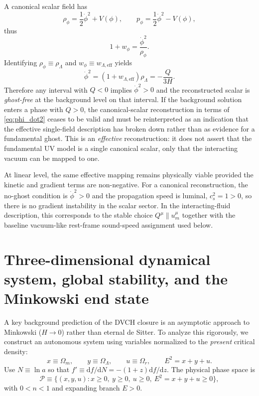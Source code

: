\documentclass[pdflatex,sn-mathphys-num]{sn-jnl}%
\newcommand{\dd}{\mathrm{d}}
\begin{document}
A canonical scalar field has
\begin{equation}
\rho_\phi = \frac{1}{2}\dot\phi^2 + V(\phi),\qquad
p_\phi = \frac{1}{2}\dot\phi^2 - V(\phi),
\end{equation}
thus
\begin{equation}
1+w_\phi = \frac{\dot\phi^2}{\rho_\phi}.
\end{equation}
Identifying $\rho_\phi\equiv \rho_\Lambda$ and $w_\phi\equiv
w_{\Lambda,\mathrm{eff}}$ yields
\begin{equation}
\dot\phi^2
= (1+w_{\Lambda,\mathrm{eff}})\rho_\Lambda
= -\frac{Q}{3H}.
\label{eq:phi_dot2}
\end{equation}
Therefore any interval with $Q<0$ implies $\dot\phi^2>0$ and the reconstructed
scalar is \emph{ghost-free} at the background level on that interval. If the
background solution enters a phase with $Q>0$, the canonical-scalar
reconstruction in terms of \eqref{eq:phi_dot2} ceases to be valid and must be
reinterpreted as an indication that the effective single-field description has
broken down rather than as evidence for a fundamental ghost. This is an
\emph{effective}
reconstruction: it does not assert that the fundamental UV model is a single
canonical scalar, only that the interacting vacuum can be mapped to one.

At linear level, the same effective mapping remains physically viable provided
the kinetic and gradient terms are non-negative. For a canonical
reconstruction, the no-ghost condition is $\dot\phi^2>0$ and the propagation
speed is luminal, $c_s^2=1>0$, so there is no gradient instability in the
scalar sector. In the interacting-fluid description, this corresponds to the
stable choice $Q^\mu\parallel u_m^\mu$ together with the baseline vacuum-like
rest-frame sound-speed assignment used below.

\section{Three-dimensional dynamical system, global stability, and the Minkowski end state}
\label{sec:dynamical}

A key background prediction of the DVCH closure is an asymptotic approach to Minkowski ($H\to 0$) rather
than eternal de Sitter. To analyze this rigorously, we construct an autonomous
system using variables normalized to the \emph{present} critical density:
\begin{equation}
x\equiv \Omega_m,\qquad y\equiv \Omega_\Lambda,\qquad u\equiv \Omega_r,
\qquad E^2=x+y+u.
\end{equation}
Use $N\equiv \ln a$ so that $f'\equiv \dd f/\dd N = -(1+z)\dd f/\dd z$.
The physical phase space is
\begin{equation}
\mathcal{P}\equiv\{(x,y,u):x\ge 0,\ y\ge 0,\ u\ge 0,\ E^2=x+y+u\ge 0\},
\end{equation}
with $0<n<1$ and expanding branch $E>0$.
\end{document}
